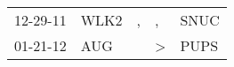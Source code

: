 \begin{supertabular}{p{0.07\textwidth}p{0.06\textwidth}p{0.02\textwidth}p{0.02\textwidth}p{0.06\textwidth}}
 12-29-11\textsuperscript{} &  WLK2\textsuperscript{} &  , &             , &  SNUC\textsuperscript{} \\
 01-21-12\textsuperscript{} &   AUG\textsuperscript{} &    &  \textgreater &  PUPS\textsuperscript{} \\
\end{supertabular}
